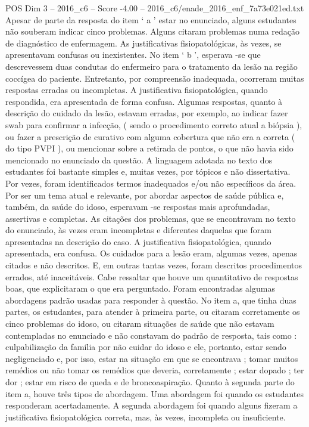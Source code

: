 \begin{textsample}{POS Dim 3 – 2016\_c6 – Score -4.00 – 2016\_c6/enade\_2016\_enf\_7a73e021ed.txt}
Apesar de parte da resposta do item ‘ a ’ estar no enunciado, alguns estudantes não souberam indicar cinco problemas.
Alguns citaram problemas numa redação de diagnóstico de enfermagem.
As justificativas fisiopatológicas, às vezes, se apresentavam confusas ou inexistentes.
No item ‘ b ’, esperava -se que descrevessem duas condutas do enfermeiro para o tratamento da lesão na região coccígea do paciente.
Entretanto, por compreensão inadequada, ocorreram muitas respostas erradas ou incompletas.
A justificativa fisiopatológica, quando respondida, era apresentada de forma confusa.
Algumas respostas, quanto à descrição do cuidado da lesão, estavam erradas, por exemplo, ao indicar fazer swab para confirmar a infecção, ( sendo o procedimento correto atual a biópsia ), ou fazer a prescrição de curativo com alguma cobertura que não era a correta ( do tipo PVPI ), ou mencionar sobre a retirada de pontos, o que não havia sido mencionado no enunciado da questão.
A linguagem adotada no texto dos estudantes foi bastante simples e, muitas vezes, por tópicos e não dissertativa.
Por vezes, foram identificados termos inadequados e/ou não específicos da área.
Por ser um tema atual e relevante, por abordar aspectos de saúde pública e, também, da saúde do idoso, esperavam -se respostas mais aprofundadas, assertivas e completas.
As citações dos problemas, que se encontravam no texto do enunciado, às vezes eram incompletas e diferentes daquelas que foram apresentadas na descrição do caso.
A justificativa fisiopatológica, quando apresentada, era confusa.
Os cuidados para a lesão eram, algumas vezes, apenas citados e não descritos.
E, em outras tantas vezes, foram descritos procedimentos errados, até inaceitáveis.
Cabe ressaltar que houve um quantitativo de respostas boas, que explicitaram o que era perguntado.
Foram encontradas algumas abordagens padrão usadas para responder à questão.
No item a, que tinha duas partes, os estudantes, para atender à primeira parte, ou citaram corretamente os cinco problemas do idoso, ou citaram situações de saúde que não estavam contempladas no enunciado e não constavam do padrão de resposta, tais como : culpabilização da família por não cuidar do idoso e ele, portanto, estar sendo negligenciado e, por isso, estar na situação em que se encontrava ; tomar muitos remédios ou não tomar os remédios que deveria, corretamente ; estar dopado ; ter dor ; estar em risco de queda e de broncoaspiração.
Quanto à segunda parte do item a, houve três tipos de abordagem.
Uma abordagem foi quando os estudantes responderam acertadamente.
A segunda abordagem foi quando alguns fizeram a justificativa fisiopatológica correta, mas, às vezes, incompleta ou insuficiente.

\end{textsample}
